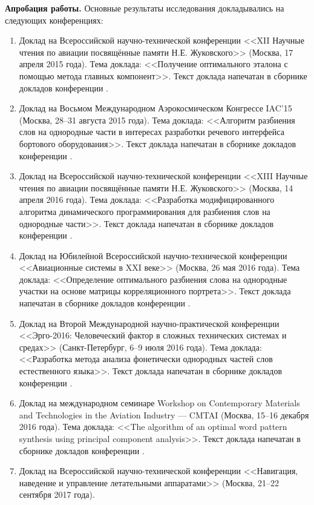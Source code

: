 \textbf{Апробация работы.}
Основные результаты исследования докладывались на следующих конференциях:
\begin{enumerate}[label={\arabic*)}]
	\item Доклад на Всероссийской научно-технической конференции <<XII Научные чтения по авиации посвящённые памяти Н.Е. Жуковского>> (Москва, 17 апреля 2015 года).
	Тема доклада: <<Получение оптимального эталона с помощью метода главных компонент>>.
	Текст доклада напечатан в сборнике докладов конференции \cite{poliyev2015pca}.
	\item Доклад на Восьмом Международном Аэрокосмическом Конгрессе IAC'15 (Москва, 28--31 августа 2015 года).
	Тема доклада: <<Алгоритм разбиения слов на однородные части в интересах разработки речевого интерфейса бортового оборудования>>.
	Текст доклада напечатан в сборнике докладов конференции \cite{poliyev2015split}.
	\item Доклад на Всероссийской научно-технической конференции <<XIII Научные чтения по авиации посвящённые памяти Н.Е. Жуковского>> (Москва, 14 апреля 2016 года).
	Тема доклада: <<Разработка модифицированного алгоритма динамического программирования для разбиения слов на однородные части>>.
	Текст доклада напечатан в сборнике докладов конференции \cite{poliyev2016dynamic}.
	\item Доклад на Юбилейной Всероссийской научно-технической конференции <<Авиационные системы в XXI веке>> (Москва, 26 мая 2016 года).
	Тема доклада: <<Определение оптимального разбиения слова на однородные участки на основе матрицы корреляционного портрета>>.
	Текст доклада напечатан в сборнике докладов конференции \cite{poliyev2016split, poliyev2017split}.
	\item Доклад на Второй Международной научно-практической конференции <<Эрго-2016: Человеческий фактор в сложных технических системах и средах>> (Санкт-Петербург, 6--9 июля 2016 года).
	Тема доклада: <<Разработка метода анализа фонетически однородных частей слов естественного языка>>.
	Текст доклада напечатан в сборнике докладов конференции \cite{poliyev2016natural}.
	\item Доклад на международном семинаре Workshop on Contemporary Materials and Technologies in the Aviation Industry --- CMTAI (Москва, 15--16 декабря 2016 года).
	Тема доклада: <<The algorithm of an optimal word pattern synthesis using principal component analysis>>.
	Текст доклада напечатан в сборнике докладов конференции \cite{poliyev2016pca}.
	\item Доклад на Всероссийской научно-технической конференции <<Навигация, наведение и управление летательными аппаратами>> (Москва, 21--22 сентября 2017 года).

\end{enumerate}

